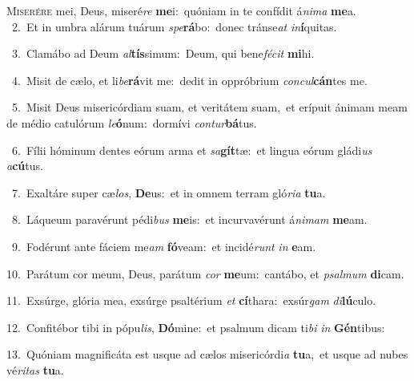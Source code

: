 \lettrine{\initial\textcolor{\initialcolor}{M}}{iserére} mei, Deus, miseré\textit{re} \textbf{me}\-i:~\star quóniam in te confídit á\-\textit{ni}\-\textit{ma} \textbf{me}\-a.\\
{\numbfont\textcolor{\numbcolor}{~2.}}~Et in umbra alárum tuárum \textit{spe}\-\textbf{rá}bo:~\star donec tránse\textit{at} \textit{in}\-\textbf{í}quitas.\par
{\numbfont\textcolor{\numbcolor}{~3.}}~Clamábo ad Deum \textit{al}\-\textbf{tís}simum:~\star Deum, qui bene\-\textit{fé}\-\textit{cit} \textbf{mi}\-hi.\par
{\numbfont\textcolor{\numbcolor}{~4.}}~Misit de cælo, et li\-\textit{be}\-\textbf{rá}vit me:~\star dedit in oppróbrium \textit{con}\-\textit{cul}\textbf{cán}tes me.\par
{\numbfont\textcolor{\numbcolor}{~5.}}~Misit Deus misericórdiam suam, et veritátem suam,~\dagger et erípuit ánimam meam de médio catulórum \textit{le}\-\textbf{ó}num:~\star dormívi \textit{con}\-\textit{tur}\textbf{bá}tus.\par
{\numbfont\textcolor{\numbcolor}{~6.}}~Fílii hóminum dentes eórum arma et \textit{sa}\-\textbf{gít}tæ:~\star et lingua eórum gládi\textit{us} \textit{a}\-\textbf{cú}tus.\par
{\numbfont\textcolor{\numbcolor}{~7.}}~Exaltáre super cæ\-\textit{los}\-, \textbf{De}\-us:~\star et in omnem terram gló\-\textit{ri}\-\textit{a} \textbf{tu}\-a.\par
{\numbfont\textcolor{\numbcolor}{~8.}}~Láqueum paravérunt pédi\textit{bus} \textbf{me}\-is:~\star et incurvavérunt á\-\textit{ni}\-\textit{mam} \textbf{me}\-am.\par
{\numbfont\textcolor{\numbcolor}{~9.}}~Fodérunt ante fáciem me\textit{am} \textbf{fó}\-veam:~\star et incidé\textit{runt} \textit{in} \textbf{e}\-am.\par
{\numbfont\textcolor{\numbcolor}{10.}}~Parátum cor meum, Deus, parátum \textit{cor} \textbf{me}\-um:~\star cantábo, et \textit{psal}\-\textit{mum} \textbf{di}\-cam.\par
{\numbfont\textcolor{\numbcolor}{11.}}~Exsúrge, glória mea, exsúrge psaltérium \textit{et} \textbf{cí}\-thara:~\star exsúr\textit{gam} \textit{di}\-\textbf{lú}culo.\par
{\numbfont\textcolor{\numbcolor}{12.}}~Confitébor tibi in pópu\-\textit{lis}\-, \textbf{Dó}\-mine:~\star et psalmum dicam ti\textit{bi} \textit{in} \textbf{Gén}\-tibus:\par
{\numbfont\textcolor{\numbcolor}{13.}}~Quóniam magnificáta est usque ad cælos misericórdi\textit{a} \textbf{tu}\-a,~\star et usque ad nubes vé\-\textit{ri}\-\textit{tas} \textbf{tu}\-a.\par
